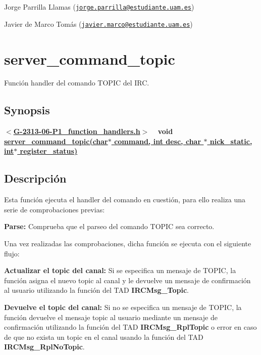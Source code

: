 \begin{DoxyItemize}
\item Jorge Parrilla Llamas (\href{mailto:jorge.parrilla@estudiante.uam.es}{\tt jorge.\+parrilla@estudiante.\+uam.\+es}) 
\item Javier de Marco Tomás (\href{mailto:javier.marco@estudiante.uam.es}{\tt javier.\+marco@estudiante.\+uam.\+es}) 
\end{DoxyItemize}\hypertarget{server_command_topic}{}\section{server\+\_\+command\+\_\+topic}\label{server_command_topic}
Función handler del comando T\+O\+P\+I\+C del I\+R\+C.\hypertarget{server_command_topic_synopsis_topic}{}\subsection{Synopsis}\label{server_command_topic_synopsis_topic}
{ {\bfseries $<$\hyperlink{G-2313-06-P1__function__handlers_8h}{G-\/2313-\/06-\/\+P1\+\_\+function\+\_\+handlers.\+h}$>$} ~\newline
 {\bfseries void \hyperlink{G-2313-06-P1__function__handlers_8c_a894ae019e03841e9d54fdad31d79f218}{server\+\_\+command\+\_\+topic(char$\ast$ command, int desc, char $\ast$ nick\+\_\+static, int$\ast$ register\+\_\+status)}} } \hypertarget{server_command_topic_descripcion_topic}{}\subsection{Descripción}\label{server_command_topic_descripcion_topic}
Esta función ejecuta el handler del comando en cuestión, para ello realiza una serie de comprobaciones previas\+:


\begin{DoxyItemize}
\item {\bfseries Parse\+:} Comprueba que el parseo del comando T\+O\+P\+I\+C sea correcto. 
\end{DoxyItemize}

Una vez realizadas las comprobaciones, dicha función se ejecuta con el siguiente flujo\+:


\begin{DoxyItemize}
\item {\bfseries Actualizar el topic del canal\+:} Si se especifica un mensaje de T\+O\+P\+I\+C, la función asigna el nuevo topic al canal y le devuelve un mensaje de confirmación al usuario utilizando la función del T\+A\+D {\bfseries I\+R\+C\+Msg\+\_\+\+Topic}.  
\item {\bfseries Devuelve el topic del canal\+:} Si no se especifica un mensaje de T\+O\+P\+I\+C, la función devuelve el mensaje topic al usuario mediante un mensaje de confirmación utilizando la función del T\+A\+D {\bfseries I\+R\+C\+Msg\+\_\+\+Rpl\+Topic} o error en caso de que no exista un topic en el canal usando la función del T\+A\+D {\bfseries I\+R\+C\+Msg\+\_\+\+Rpl\+No\+Topic}.  
\end{DoxyItemize}

